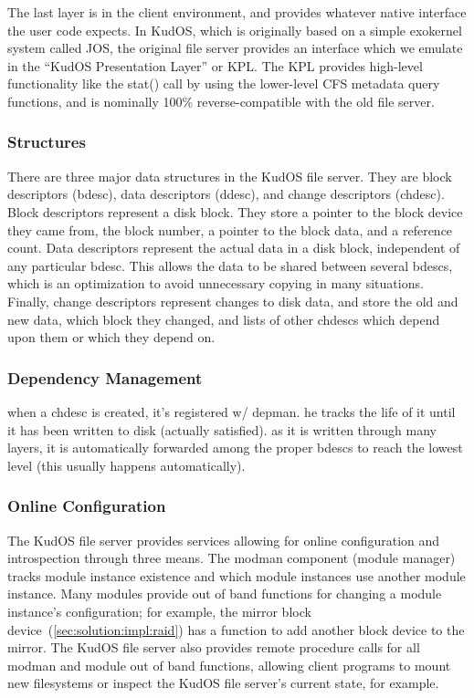 The last layer is in the client environment, and provides whatever native
interface the user code expects. In KudOS, which is originally based on a simple
exokernel system called JOS, the original file server provides an interface
which we emulate in the ``KudOS Presentation Layer'' or KPL. The KPL provides
high-level functionality like the stat() call by using the lower-level CFS
metadata query functions, and is nominally 100\% reverse-compatible with the old
file server.

\subsubsection{Structures}

There are three major data structures in the KudOS file server. They are block
descriptors (bdesc), data descriptors (ddesc), and change descriptors (chdesc).
Block descriptors represent a disk block. They store a pointer to the block
device they came from, the block number, a pointer to the block data, and a
reference count. Data descriptors represent the actual data in a disk block,
independent of any particular bdesc. This allows the data to be shared between
several bdescs, which is an optimization to avoid unnecessary copying in many
situations. Finally, change descriptors represent changes to disk data, and
store the old and new data, which block they changed, and lists of other chdescs
which depend upon them or which they depend on.

\subsubsection{Dependency Management}

when a chdesc is created, it's registered w/ depman. he tracks the
life of it until it has been written to disk (actually satisfied). as
it is written through many layers, it is automatically forwarded
among the proper bdescs to reach the lowest level (this usually
happens automatically).

\subsubsection{Online Configuration}

The KudOS file server provides services allowing for online configuration
and introspection through three means. The modman component (module
manager) tracks module instance existence and which module instances use
another module instance. Many modules provide out of band functions for
changing a module instance's configuration; for example, the mirror block
device~(\ref{sec:solution:impl:raid}) has a function to add another block
device to the mirror. The KudOS file server also provides remote
procedure calls for all modman and module out of band functions, allowing
client programs to mount new filesystems or inspect the KudOS file server's
current state, for example.

